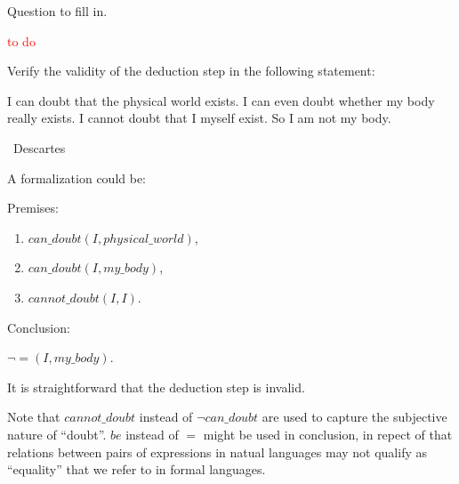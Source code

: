 
\begin{exercise}{1.1}
  Question to fill in.
\end{exercise}

\textcolor{red}{to do}

\begin{exercise}{1.2}
  Verify the validity of the deduction step in the following statement:

  I can doubt that the physical world exists. I can even doubt whether my body really exists. I cannot doubt that I myself exist. So I am not my body.

  \hfill \textemdash\ Descartes

\end{exercise}

A formalization could be:

Premises:
\begin{enumerate}
  \item $can\_doubt(I, physical\_world)$,
  \item $can\_doubt(I, my\_body)$,
  \item $cannot\_doubt(I, I)$.
\end{enumerate}
Conclusion:

$\neg =(I, my\_body)$.

It is straightforward that the deduction step is invalid.

Note that $cannot\_doubt$ instead of $\neg can\_doubt$ are used to capture the subjective nature of ``doubt''. $be$ instead of $=$ might be used in conclusion, in repect of that relations between pairs of expressions in natual languages may not qualify as ``equality'' that we refer to in formal languages.
